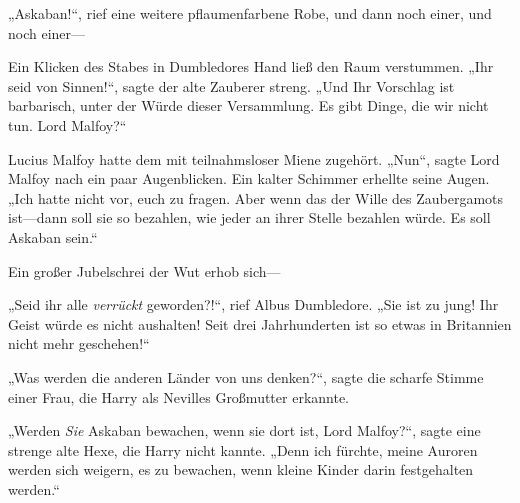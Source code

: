 „Askaban!“, rief eine weitere pflaumenfarbene Robe, und dann noch einer, und noch einer—

Ein Klicken des Stabes in Dumbledores Hand ließ den Raum verstummen. „Ihr seid von Sinnen!“, sagte der alte Zauberer streng. „Und Ihr Vorschlag ist barbarisch, unter der Würde dieser Versammlung. Es gibt Dinge, die wir nicht tun. Lord Malfoy?“

Lucius Malfoy hatte dem mit teilnahmsloser Miene zugehört.
„Nun“, sagte Lord Malfoy nach ein paar Augenblicken. Ein kalter Schimmer erhellte seine Augen. „Ich hatte nicht vor, euch zu fragen. Aber wenn das der Wille des Zaubergamots ist—dann soll sie so bezahlen, wie jeder an ihrer Stelle bezahlen würde. Es soll Askaban sein.“

Ein großer Jubelschrei der Wut erhob sich—

„Seid ihr alle \emph{verrückt} geworden?!“, rief Albus Dumbledore. „Sie ist zu jung! Ihr Geist würde es nicht aushalten! Seit drei Jahrhunderten ist so etwas in Britannien nicht mehr geschehen!“

„Was werden die anderen Länder von uns denken?“, sagte die scharfe Stimme einer Frau, die Harry als Nevilles Großmutter erkannte.

„Werden \emph{Sie} Askaban bewachen, wenn sie dort ist, Lord Malfoy?“, sagte eine strenge alte Hexe, die Harry nicht kannte. „Denn ich fürchte, meine Auroren werden sich weigern, es zu bewachen, wenn kleine Kinder darin festgehalten werden.“

